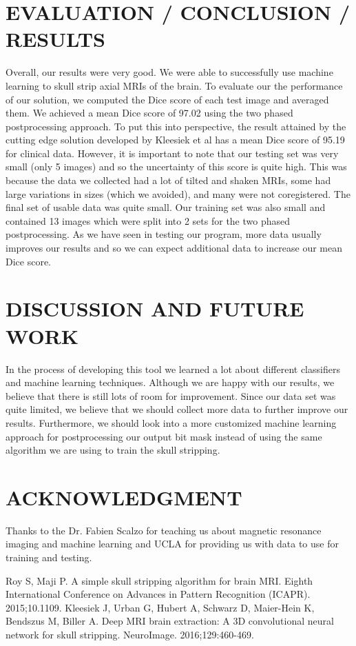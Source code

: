 \documentclass[letterpaper, 10 pt, conference]{ieeeconf}
\begin{document}
\section{EVALUATION / CONCLUSION / RESULTS}
Overall, our results were very good. We were able to successfully use machine learning to skull strip axial MRIs of the brain. To evaluate our the performance of our solution, we computed the Dice score of each test image and averaged them. We achieved a mean Dice score of 97.02 using the two phased postprocessing approach. To put this into perspective, the result attained by the cutting edge solution developed by Kleesiek et al has a mean Dice score of 95.19 for clinical data. However, it is important to note that our testing set was very small (only 5 images) and so the uncertainty of this score is quite high. This was because the data we collected had a lot of tilted and shaken MRIs, some had large variations in sizes (which we avoided), and many were not coregistered. The final set of usable data was quite small. Our training set was also small and contained 13 images which were split into 2 sets for the two phased postprocessing. As we have seen in testing our program, more data usually improves our results and so we can expect additional data to increase our mean Dice score.

\section{DISCUSSION AND FUTURE WORK}
In the process of developing this tool we learned a lot about different classifiers and machine learning techniques. Although we are happy with our results, we believe that there is still lots of room for improvement. Since our data set was quite limited, we believe that we should collect more data to further improve our results. Furthermore, we should look into a more customized machine learning approach for postprocessing our output bit mask instead of using the same algorithm we are using to train the skull stripping.

\section*{ACKNOWLEDGMENT}

Thanks to the Dr. Fabien Scalzo for teaching us about magnetic resonance imaging and machine learning and UCLA for providing us with data to use for training and testing.

\begin{thebibliography}{99}

 Roy S, Maji P. A simple skull stripping algorithm for brain MRI. Eighth International Conference on Advances in Pattern Recognition (ICAPR). 2015;10.1109.
 Kleesiek J, Urban G, Hubert A, Schwarz D, Maier-Hein K, Bendszus M, Biller A. Deep MRI brain extraction: A 3D convolutional neural network for skull stripping. NeuroImage. 2016;129:460-469.

\end{thebibliography}
\end{document}
